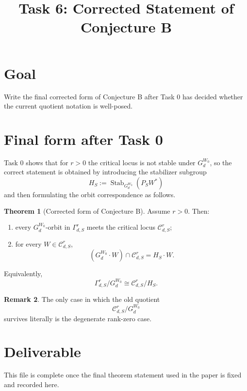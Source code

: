 \documentclass{article}
\title{Task 6: Corrected Statement of Conjecture B}
\date{}
\newcommand{\Stab}{\operatorname{Stab}}
\theoremstyle{definition}
\newtheorem{theorem}{Theorem}[section]
\newtheorem{remark}[theorem]{Remark}
\begin{document}
\maketitle

\section{Goal}

Write the final corrected form of Conjecture B after Task 0 has decided whether the current quotient notation is well-posed.

\section{Final form after Task 0}

Task 0 shows that for $r>0$ the critical locus is not stable under $G_d^{W_0}$, so the correct statement is obtained by introducing the stabilizer subgroup
\[
H_S:=\Stab_{G_d^{W_0}}(P_SW^\ast)
\]
and then formulating the orbit correspondence as follows.

\begin{theorem}[Corrected form of Conjecture B]
Assume $r>0$. Then:
\begin{enumerate}
\item every $G_d^{W_0}$-orbit in $\Gamma_{d,S}^r$ meets the critical locus $\mathcal C_{d,S}^r$;
\item for every $W\in \mathcal C_{d,S}^r$,
\[
(G_d^{W_0}\cdot W)\cap \mathcal C_{d,S}^r
=
H_S\cdot W.
\]
\end{enumerate}
Equivalently,
\[
\Gamma_{d,S}^r/G_d^{W_0}
\cong
\mathcal C_{d,S}^r/H_S.
\]
\end{theorem}

\begin{remark}
The only case in which the old quotient
\[
\mathcal C_{d,S}^r/G_d^{W_0}
\]
survives literally is the degenerate rank-zero case.
\end{remark}

\section{Deliverable}

This file is complete once the final theorem statement used in the paper is fixed and recorded here.
\end{document}

